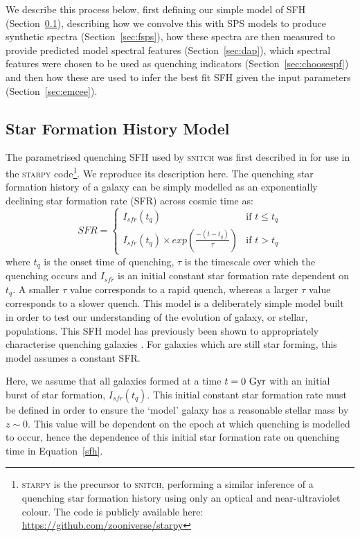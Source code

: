 \documentclass[useAMS,usenatbib]{mn2e}
\begin{document}
We describe this process below, first defining our simple model of SFH (Section~\ref{sec:sfh}), describing how we convolve this with SPS models to produce synthetic spectra (Section~\ref{sec:fsps}), how these spectra are then measured to provide predicted model spectral features (Section~\ref{sec:dap}), which spectral features were chosen to be used as quenching indicators (Section~\ref{sec:choosespf}) and then how these are used to infer the best fit SFH given the input parameters (Section~\ref{sec:emcee}). 

\subsection{Star Formation History Model}\label{sec:sfh}

The parametrised quenching SFH used by \textsc{snitch} was first described in \cite{smethurst15} for use in the \textsc{starpy} code\footnote{\textsc{starpy} is the precursor to \textsc{snitch}, performing a similar inference of a quenching star formation history using only an optical and near-ultraviolet colour. The code is publicly available here: \url{https://github.com/zooniverse/starpy}}. We reproduce its description here. The quenching star formation history of a galaxy can be simply modelled as an exponentially declining star formation rate (SFR) across cosmic time as:
\begin{equation}\label{sfh}
SFR =
\begin{cases}
I_{sfr}(t_q) & \text{if } t \leq t_q \\
I_{sfr}(t_q) \times exp{\left( \frac{-(t-t_{q})}{\tau}\right)} & \text{if } t > t_q 
\end{cases}
\end{equation}
where $t_{q}$ is the onset time of quenching, $\tau$ is the timescale over which the quenching occurs and $I_{sfr}$ is an initial constant star formation rate dependent on $t_q$.  A smaller $\tau$ value corresponds to a rapid quench, whereas a larger $\tau$ value corresponds to a slower quench. This model is a deliberately simple model built in order to test our understanding of the evolution of galaxy, or stellar, populations. This SFH model has previously been shown to appropriately characterise quenching galaxies \citep{weiner06, martin07, noeske07,schawinski14, smethurst15}. For galaxies which are still star forming, this model assumes a constant SFR.



Here, we assume that all galaxies formed at a time $t=0~\rm{Gyr}$ with an initial burst of star formation, $I_{sfr}(t_q)$. This initial constant star formation rate must be defined in order to ensure the `model' galaxy  has a reasonable stellar mass by $z\sim0$. This value will be dependent on the epoch at which quenching is modelled to occur, hence the dependence of this initial star formation rate on quenching time in Equation~\ref{sfh}. 
\end{document}
